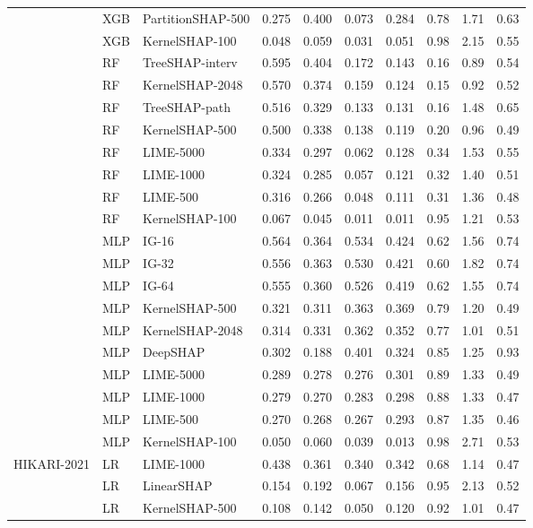 \begin{longtable}{lllrrrrrrr}
 & XGB & PartitionSHAP-500 & 0.275 & 0.400 & 0.073 & 0.284 & 0.78 & 1.71 & 0.63 \\
 & XGB & KernelSHAP-100 & 0.048 & 0.059 & 0.031 & 0.051 & 0.98 & 2.15 & 0.55 \\
 & RF & TreeSHAP-interv & 0.595 & 0.404 & 0.172 & 0.143 & 0.16 & 0.89 & 0.54 \\
 & RF & KernelSHAP-2048 & 0.570 & 0.374 & 0.159 & 0.124 & 0.15 & 0.92 & 0.52 \\
 & RF & TreeSHAP-path & 0.516 & 0.329 & 0.133 & 0.131 & 0.16 & 1.48 & 0.65 \\
 & RF & KernelSHAP-500 & 0.500 & 0.338 & 0.138 & 0.119 & 0.20 & 0.96 & 0.49 \\
 & RF & LIME-5000 & 0.334 & 0.297 & 0.062 & 0.128 & 0.34 & 1.53 & 0.55 \\
 & RF & LIME-1000 & 0.324 & 0.285 & 0.057 & 0.121 & 0.32 & 1.40 & 0.51 \\
 & RF & LIME-500 & 0.316 & 0.266 & 0.048 & 0.111 & 0.31 & 1.36 & 0.48 \\
 & RF & KernelSHAP-100 & 0.067 & 0.045 & 0.011 & 0.011 & 0.95 & 1.21 & 0.53 \\
 & MLP & IG-16 & 0.564 & 0.364 & 0.534 & 0.424 & 0.62 & 1.56 & 0.74 \\
 & MLP & IG-32 & 0.556 & 0.363 & 0.530 & 0.421 & 0.60 & 1.82 & 0.74 \\
 & MLP & IG-64 & 0.555 & 0.360 & 0.526 & 0.419 & 0.62 & 1.55 & 0.74 \\
 & MLP & KernelSHAP-500 & 0.321 & 0.311 & 0.363 & 0.369 & 0.79 & 1.20 & 0.49 \\
 & MLP & KernelSHAP-2048 & 0.314 & 0.331 & 0.362 & 0.352 & 0.77 & 1.01 & 0.51 \\
 & MLP & DeepSHAP & 0.302 & 0.188 & 0.401 & 0.324 & 0.85 & 1.25 & 0.93 \\
 & MLP & LIME-5000 & 0.289 & 0.278 & 0.276 & 0.301 & 0.89 & 1.33 & 0.49 \\
 & MLP & LIME-1000 & 0.279 & 0.270 & 0.283 & 0.298 & 0.88 & 1.33 & 0.47 \\
 & MLP & LIME-500 & 0.270 & 0.268 & 0.267 & 0.293 & 0.87 & 1.35 & 0.46 \\
 & MLP & KernelSHAP-100 & 0.050 & 0.060 & 0.039 & 0.013 & 0.98 & 2.71 & 0.53 \\
\midrule
HIKARI-2021 & LR & LIME-1000 & 0.438 & 0.361 & 0.340 & 0.342 & 0.68 & 1.14 & 0.47 \\
 & LR & LinearSHAP & 0.154 & 0.192 & 0.067 & 0.156 & 0.95 & 2.13 & 0.52 \\
 & LR & KernelSHAP-500 & 0.108 & 0.142 & 0.050 & 0.120 & 0.92 & 1.01 & 0.47 \\

\end{longtable}
